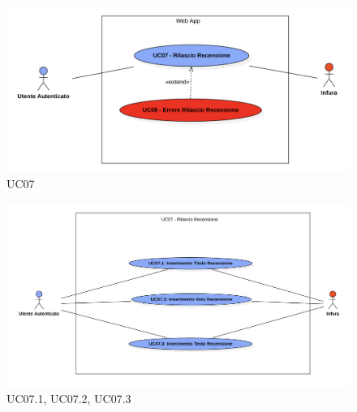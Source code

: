             \begin{figure}[H]
                \centering
                \includegraphics[scale=0.6]{src/img/UC07.png}
                \caption{UC07}
            \end{figure}

            \begin{figure}[H]
                \centering
                \includegraphics[scale=0.4]{src/img/UC07.X.png}
                \caption{UC07.1, UC07.2, UC07.3}
            \end{figure}

